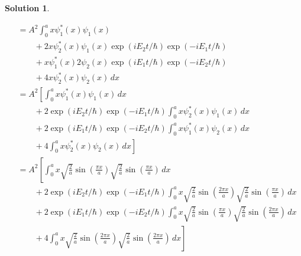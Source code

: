 \documentclass[10pt]{article}
\theoremstyle{definition}
\newtheorem{soln}{Solution}
\begin{document}
\begin{soln}
\begin{enumerate}[label=(\alph*)]
\begin{align*}
             & =A^2\int_{0}^{a}x\psi_1^*(x)\psi_1(x)                                                                                                                             \\
             & \qquad+2x\psi_2^*(x)\psi_1(x)\exp(iE_2t/\hbar)\exp(-iE_1t/\hbar)                                                                                                  \\
             & \qquad+x\psi_1^*(x)2\psi_2(x)\exp(iE_1t/\hbar)\exp(-iE_2t/\hbar)                                                                                                  \\
             & \qquad+4x\psi_2^*(x)\psi_2(x)\,dx                                                                                                                                 \\
             & =A^2\left[\int_{0}^{a}x\psi_1^*(x)\psi_1(x)\,dx\right.                                                                                                            \\
             & \qquad+2\exp(iE_2t/\hbar)\exp(-iE_1t/\hbar)\int_{0}^{a}x\psi_2^*(x)\psi_1(x)\,dx                                                                                  \\
             & \qquad+2\exp(iE_1t/\hbar)\exp(-iE_2t/\hbar)\int_{0}^{a}x\psi_1^*(x)\psi_2(x)\,dx                                                                                  \\
             & \qquad+\left.4\int_{0}^{a}x\psi_2^*(x)\psi_2(x)\,dx\right]                                                                                                        \\
             & =A^2\left[\int_{0}^{a}x\sqrt{\frac{2}{a}}\sin\left(\frac{\pi x}{a}\right)\sqrt{\frac{2}{a}}\sin\left(\frac{\pi x}{a}\right)\,dx\right.                            \\
             & \qquad+2\exp(iE_2t/\hbar)\exp(-iE_1t/\hbar)\int_{0}^{a}x\sqrt{\frac{2}{a}}\sin\left(\frac{2\pi x}{a}\right)\sqrt{\frac{2}{a}}\sin\left(\frac{\pi x}{a}\right)\,dx \\
             & \qquad+2\exp(iE_1t/\hbar)\exp(-iE_2t/\hbar)\int_{0}^{a}x\sqrt{\frac{2}{a}}\sin\left(\frac{\pi x}{a}\right)\sqrt{\frac{2}{a}}\sin\left(\frac{2\pi x}{a}\right)\,dx \\
             & \qquad+\left.4\int_{0}^{a}x\sqrt{\frac{2}{a}}\sin\left(\frac{2\pi x}{a}\right)\sqrt{\frac{2}{a}}\sin\left(\frac{2\pi x}{a}\right)\,dx\right]                      \\

\end{align*}
\end{enumerate}
\end{soln}
\end{document}
